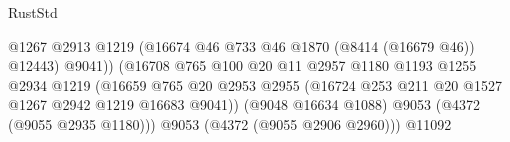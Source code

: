 \begin{lexlean}{RustStd}
\begin{coremodule}
                                                      @1267
                                                      @2913
                                                      @1219
                                                      (@16674
                                                        @46
                                                        @733
                                                        @46
                                                        @1870
                                                        (@8414 (@16679 @46))
                                                        @12443)
                                                      @9041))
                                                  (@16708
                                                    @765
                                                    @100
                                                    @20
                                                    @11
                                                    @2957
                                                    @1180
                                                    @1193
                                                    @1255
                                                    @2934
                                                    @1219
                                                    (@16659
                                                      @765
                                                      @20
                                                      @2953
                                                      @2955
                                                      (@16724
                                                        @253
                                                        @211
                                                        @20
                                                        @1527
                                                        @1267
                                                        @2942
                                                        @1219
                                                        @16683
                                                        @9041))
                                                    (@9048 @16634 @1088)
                                                    @9053
                                                    (@4372 (@9055 @2935 @1180)))
                                                  @9053
                                                  (@4372 (@9055 @2906 @2960)))
                                                @11092

\end{coremodule}
\end{lexlean}
